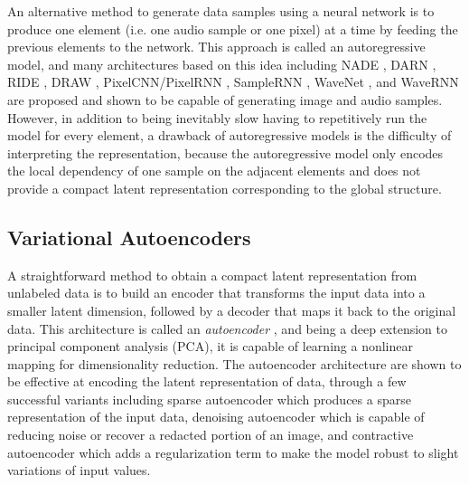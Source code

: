 An alternative method to generate data samples using a neural network is to produce one element (i.e. one audio sample or one pixel) at a time by feeding the previous elements to the network.
This approach is called an autoregressive model, and many architectures based on this idea including NADE \cite{larochelle2011nade}, DARN \cite{gregor2013darn}, RIDE \cite{theis2015ride}, DRAW \cite{gregor2015draw}, PixelCNN/PixelRNN \cite{oord2016pixel}, SampleRNN \cite{mehri2016samplernn}, WaveNet \cite{oord2016wavenet}, and WaveRNN \cite{kalchbrenner2018wavernn} are proposed and shown to be capable of generating image and audio samples.
However, in addition to being inevitably slow having to repetitively run the model for every element, a drawback of autoregressive models is the difficulty of interpreting the representation, because the autoregressive model only encodes the local dependency of one sample on the adjacent elements and does not provide a compact latent representation corresponding to the global structure.

\subsection{Variational Autoencoders}

A straightforward method to obtain a compact latent representation from unlabeled data is to build an encoder that transforms the input data into a smaller latent dimension, followed by a decoder that maps it back to the original data.
This architecture is called an \emph{autoencoder} \cite{bengio2009deeplearning}, and being a deep extension to principal component analysis (PCA), it is capable of learning a nonlinear mapping for dimensionality reduction.
The autoencoder architecture are shown to be effective at encoding the latent representation of data, through a few successful variants including sparse autoencoder \cite{ng2011sparse} which produces a sparse representation of the input data, denoising autoencoder \cite{vincent2008denoising} which is capable of reducing noise or recover a redacted portion of an image, and contractive autoencoder \cite{rifai2011contractive} which adds a regularization term to make the model robust to slight variations of input values.


